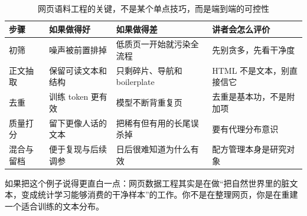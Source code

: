 \begin{table}[H]
\centering
\begin{tabular}{p{}p{}p{}p{}}
\toprule
\textbf{步骤} & \textbf{如果做得好} & \textbf{如果做得差} & \textbf{讲者会怎么评价} \\
\midrule
初筛 & 噪声被前置排掉 & 低质页一开始就污染全流程 & 先别贪多，先看干净度 \\
正文抽取 & 保留可读文本和结构 & 只剩碎片、导航和 boilerplate & HTML 不是文本，别直接信它 \\
去重 & 训练 token 更有效 & 模型不断背重复页 & 去重是基本功，不是附加项 \\
质量打分 & 留下更像人话的文本 & 把稀有但有用的长尾误杀掉 & 要有代理分布意识 \\
混合与留档 & 便于复现与后续调参 & 日后很难知道为什么有效 & 配方管理本身是研究对象 \\
\bottomrule
\end{tabular}
\caption{网页语料工程的关键，不是某个单点技巧，而是端到端的可控性}
\end{table}

如果把这个例子说得更直白一点：网页数据工程其实是在做“把自然世界里的脏文本，变成统计学习能够消费的干净样本”的工作。你不是在整理网页，你是在重建一个适合训练的文本分布。

